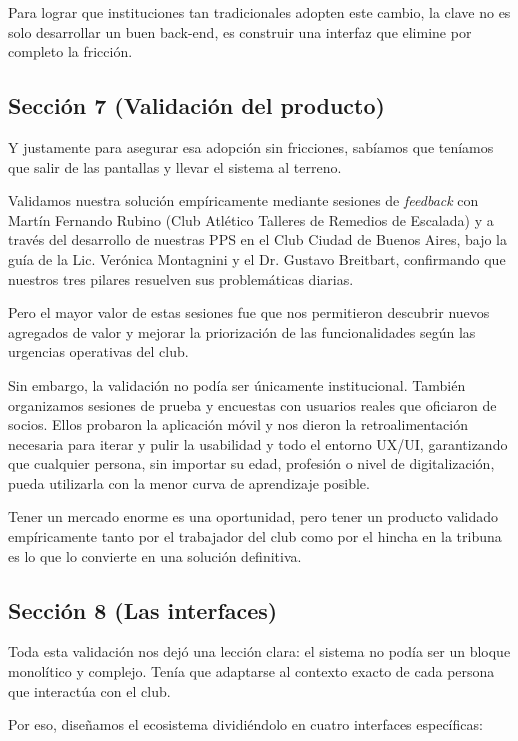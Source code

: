 Para lograr que instituciones tan tradicionales adopten este cambio, la clave no es solo desarrollar un buen back-end, es construir una interfaz que elimine por completo la fricción.

\subsection{Sección 7 (Validación del producto)}

Y justamente para asegurar esa adopción sin fricciones, sabíamos que teníamos que salir de las pantallas y llevar el sistema al terreno.

Validamos nuestra solución empíricamente mediante sesiones de \textit{feedback} con Martín Fernando Rubino (Club Atlético Talleres de Remedios de Escalada) y a través del desarrollo de nuestras PPS en el Club Ciudad de Buenos Aires, bajo la guía de la Lic. Verónica Montagnini y el Dr. Gustavo Breitbart, confirmando que nuestros tres pilares resuelven sus problemáticas diarias.

Pero el mayor valor de estas sesiones fue que nos permitieron descubrir nuevos agregados de valor y mejorar la priorización de las funcionalidades según las urgencias operativas del club.

Sin embargo, la validación no podía ser únicamente institucional. También organizamos sesiones de prueba y encuestas con usuarios reales que oficiaron de socios. Ellos probaron la aplicación móvil y nos dieron la retroalimentación necesaria para iterar y pulir la usabilidad y todo el entorno UX/UI, garantizando que cualquier persona, sin importar su edad, profesión o nivel de digitalización, pueda utilizarla con la menor curva de aprendizaje posible.

Tener un mercado enorme es una oportunidad, pero tener un producto validado empíricamente tanto por el trabajador del club como por el hincha en la tribuna es lo que lo convierte en una solución definitiva.

\subsection{Sección 8 (Las interfaces)}

Toda esta validación nos dejó una lección clara: el sistema no podía ser un bloque monolítico y complejo. Tenía que adaptarse al contexto exacto de cada persona que interactúa con el club. 

Por eso, diseñamos el ecosistema dividiéndolo en cuatro interfaces específicas:


